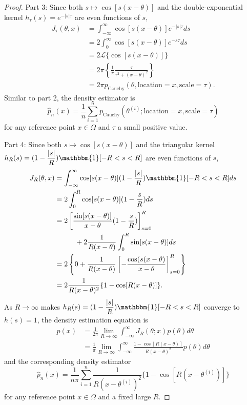 \documentclass[%
 reprint,
 amsmath,amssymb,
 aps,
]{revtex4-2}
\begin{document}
\begin{proof}
    Part 3: Since both $s \mapsto \cos[s(x - \theta)]$ and the double-exponential kernel $h_\tau(s) = e^{-|s|\tau}$ are even functions of $s$,
    \begin{align*}
        J_\tau(\theta, x) & = \int_{-\infty}^\infty \cos[s(x - \theta)]e^{-|s|\tau}ds \\
        & = 2\int_0^\infty \cos[s(x - \theta)]e^{-s\tau}ds \\
        & = 2 \mathcal{L}\{\cos[s(x - \theta)]\} \\
        & = 2\pi \left\{\frac{1}{\pi}\frac{\tau}{\tau^2 + (x - \theta)^2}\right\} \\
        & = 2\pi p_\text{Cauchy}(\theta, \text{location} = x, \text{scale} = \tau).
    \end{align*}
    Similar to part 2, the density estimator is
    \begin{equation*}
        \hat{p}_n(x) = \frac{1}{n} \sum_{i = 1}^n p_\text{Cauchy}(\theta^{(i)}; \text{location} = x, \text{scale} = \tau)
    \end{equation*}
    for any reference point $x \in \Omega$ and $\tau$ a small positive value.

    Part 4: Since both $s \mapsto \cos[s(x - \theta)]$ and the triangular kernel $\displaystyle h_R(s) = (1 - \frac{|s|}{R}) \mathbbm{1}[-R < s < R]$ are even functions of $s$,
    \begin{align*}
        J_R(\theta, x) & = \int_{-\infty}^\infty \cos[s(x - \theta)](1 - \frac{|s|}{R}) \mathbbm{1}[-R < s < R]ds \\
        & = 2 \int_0^R \cos[s(x - \theta)](1 - \frac{s}{R}) ds \\
        & = 2\left[\frac{\sin[s(x - \theta)]}{x - \theta}(1 - \frac{s}{R}) \right]^R_{s = 0} \\
        & \hspace{1cm} + 2\frac{1}{R(x - \theta)}\int_0^R \sin[s(x - \theta)]ds \\
        & = 2\left\{0+\frac{1}{R(x - \theta)} \left[-\frac{\cos(s(x - \theta)}{x - \theta} \right]^R_{s = 0} \right\} \\
        & = 2\frac{1}{R(x - \theta)^2}\{1 - \cos[R(x - \theta)]\}.
    \end{align*}
    As $R \to \infty$ makes $\displaystyle h_R(s) = (1 - \frac{|s|}{R}) \mathbbm{1}[-R < s < R]$ converge to $h(s) = 1$, the density estimation equation is
    \begin{align*}
        p(x) & = \frac{1}{2\pi} \lim_{R \to \infty} \int_{-\infty}^\infty J_R(\theta; x) p(\theta)d\theta \\
        & = \frac{1}{\pi} \lim_{R \to \infty} \int_{-\infty}^\infty \frac{1 - \cos[R(x - \theta)]}{R(x - \theta)^2} p(\theta) d\theta
    \end{align*}
    and the corresponding density estimator
    \begin{equation*}
        \hat{p}_n(x) = \frac{1}{n\pi} \sum_{i = 1}^n \frac{1}{R(x - \theta^{(i)})^2}\{1 - \cos[R(x - \theta^{(i)})]\}
    \end{equation*}
    for any reference point $x \in \Omega$ and a fixed large $R$.


\end{proof}
\end{document}
